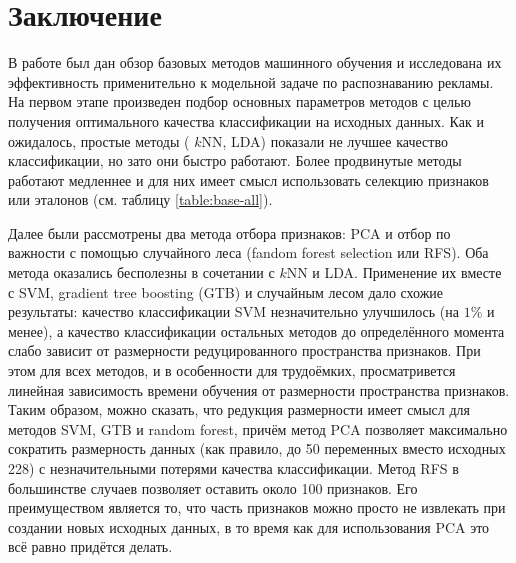 \section{Заключение}
В работе был дан обзор базовых методов машинного обучения и исследована их эффективность применительно к модельной задаче по распознаванию рекламы. На первом этапе произведен подбор основных параметров методов с целью получения оптимального качества классификации на исходных данных. Как и ожидалось, простые методы (
\(k\)NN, LDA) показали не лучшее качество классификации, но зато они быстро работают. Более продвинутые методы работают медленнее и для них имеет смысл использовать селекцию признаков или эталонов (см. таблицу \ref{table:base-all}). 
\par
Далее были рассмотрены два метода отбора признаков: PCA и отбор по важности с помощью случайного леса (fandom forest selection или RFS). Оба метода оказались бесполезны в сочетании с \(k\)NN и LDA. Применение их вместе с SVM, gradient tree boosting (GTB) и случайным лесом дало схожие результаты: качество классификации SVM незначительно улучшилось (на \(1\%\) и менее), а качество классификации остальных методов до определённого момента слабо зависит от размерности редуцированного пространства признаков. При этом для всех методов, и в особенности для трудоёмких, просматривется линейная зависимость времени обучения от размерности пространства признаков. Таким образом, можно сказать, что редукция размерности имеет смысл для методов SVM, GTB и random forest, причём метод PCA позволяет максимально сократить размерность данных (как правило, до 50 переменных вместо исходных 228) с незначительными потерями качества классификации. Метод RFS в большинстве случаев позволяет оставить около 100 признаков. Его преимуществом является то, что часть признаков можно просто не извлекать при создании новых исходных данных, в то время как для использования PCA это всё равно придётся делать.